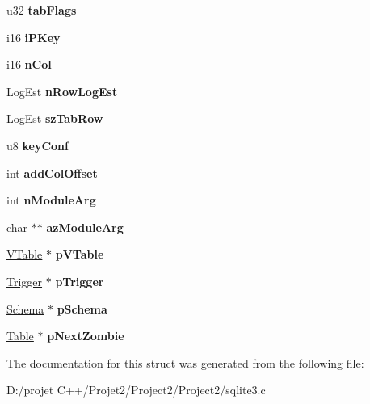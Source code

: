 \begin{DoxyCompactItemize}
u32 {\bfseries tab\+Flags}
\item 
\mbox{\label{struct_table_af5e592498393a990cb1344555fa86409}} 
i16 {\bfseries i\+P\+Key}
\item 
\mbox{\label{struct_table_a1a8346811ba23fdfd90c5b54076bbefb}} 
i16 {\bfseries n\+Col}
\item 
\mbox{\label{struct_table_ae3835f1c227f6f14ec412d04fae854aa}} 
Log\+Est {\bfseries n\+Row\+Log\+Est}
\item 
\mbox{\label{struct_table_a141c547347c585b17f9ca2664967ab75}} 
Log\+Est {\bfseries sz\+Tab\+Row}
\item 
\mbox{\label{struct_table_add1b22425db781d976d25b4465a2965a}} 
u8 {\bfseries key\+Conf}
\item 
\mbox{\label{struct_table_ab6f1ad10bce5c20faca55cd0a9c3f1ff}} 
int {\bfseries add\+Col\+Offset}
\item 
\mbox{\label{struct_table_a74a2c5547ea876ebe77dbea0d99361bf}} 
int {\bfseries n\+Module\+Arg}
\item 
\mbox{\label{struct_table_af3af6596efa41894bcd3c3c9f9b6781f}} 
char $\ast$$\ast$ {\bfseries az\+Module\+Arg}
\item 
\mbox{\label{struct_table_a7b9903cfbfefe7b8bf872c4f50cb2e95}} 
\mbox{\hyperlink{struct_v_table}{V\+Table}} $\ast$ {\bfseries p\+V\+Table}
\item 
\mbox{\label{struct_table_aca61c40bb0164f2c6fc3406c28988660}} 
\mbox{\hyperlink{struct_trigger}{Trigger}} $\ast$ {\bfseries p\+Trigger}
\item 
\mbox{\label{struct_table_a1d6ce038a061722cebaeba0f3ffceacf}} 
\mbox{\hyperlink{struct_schema}{Schema}} $\ast$ {\bfseries p\+Schema}
\item 
\mbox{\label{struct_table_ae365eb0d8f6d3cb39f3908323cba45e4}} 
\mbox{\hyperlink{struct_table}{Table}} $\ast$ {\bfseries p\+Next\+Zombie}
\end{DoxyCompactItemize}


The documentation for this struct was generated from the following file\+:\begin{DoxyCompactItemize}
\item 
D\+:/projet C++/\+Projet2/\+Project2/\+Project2/sqlite3.\+c\end{DoxyCompactItemize}
